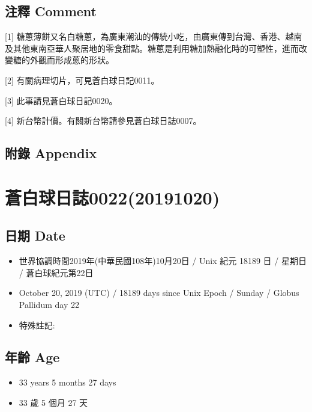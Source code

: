 \documentclass[a5paper, 12pt
]{book}
\providecommand{\tightlist}{%
  \setlength{\itemsep}{0pt}\setlength{\parskip}{0pt}}
\begin{document}
\hypertarget{ux6ce8ux91cb-comment-14}{%
\subsection{注釋 Comment}\label{ux6ce8ux91cb-comment-14}}

{[}1{]}
糖蔥薄餅又名白糖蔥，為廣東潮汕的傳統小吃，由廣東傳到台灣、香港、越南及其他東南亞華人聚居地的零食甜點。糖蔥是利用糖加熱融化時的可塑性，進而改變糖的外觀而形成蔥的形狀。

{[}2{]} 有關病理切片，可見蒼白球日記0011。

{[}3{]} 此事請見蒼白球日記0020。

{[}4{]} 新台幣計價。有關新台幣請參見蒼白球日誌0007。

\hypertarget{ux9644ux9304-appendix-13}{%
\subsection{附錄 Appendix}\label{ux9644ux9304-appendix-13}}

\hypertarget{ux84bcux767dux7403ux65e5ux8a8c002220191020}{%
\section{蒼白球日誌0022(20191020)}\label{ux84bcux767dux7403ux65e5ux8a8c002220191020}}

\hypertarget{ux65e5ux671f-date-21}{%
\subsection{日期 Date}\label{ux65e5ux671f-date-21}}

\begin{itemize}
\tightlist
\item
  世界協調時間2019年(中華民國108年)10月20日 / Unix 紀元 18189 日 /
  星期日 / 蒼白球紀元第22日
\item
  October 20, 2019 (UTC) / 18189 days since Unix Epoch / Sunday / Globus
  Pallidum day 22
\item
  特殊註記:
\end{itemize}

\hypertarget{ux5e74ux9f61-age-21}{%
\subsection{年齡 Age}\label{ux5e74ux9f61-age-21}}

\begin{itemize}
\tightlist
\item
  33 years 5 months 27 days
\item
  33 歲 5 個月 27 天
\end{itemize}
\end{document}
